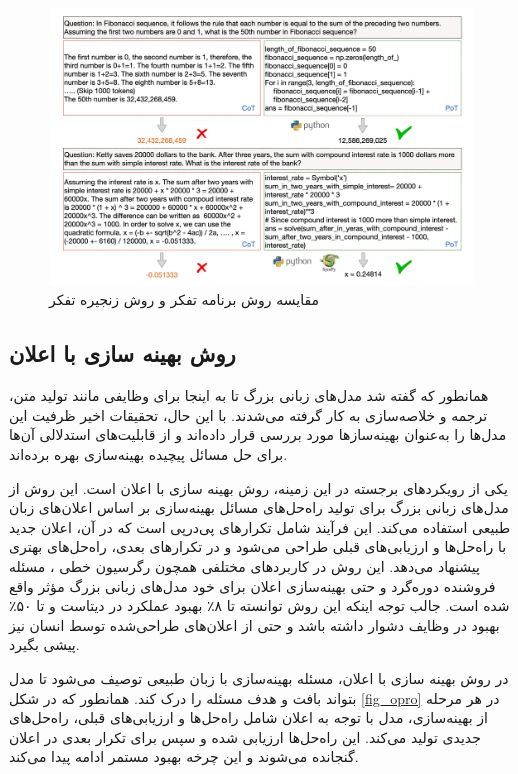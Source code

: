 \begin{figure}[!t]
	\centering
	\includegraphics[width=140mm]{images/pot}
	\caption{مقایسه روش برنامه تفکر و روش زنجیره تفکر}
	\label{fig_pot}
\end{figure}

\subsection{روش بهینه سازی با اعلان}
همانطور که گفته شد مدل‌های زبانی بزرگ تا به اینجا برای وظایفی مانند تولید متن، ترجمه و خلاصه‌سازی به کار گرفته می‌شدند. با این حال، تحقیقات اخیر ظرفیت این مدل‌ها را به‌عنوان بهینه‌سازها مورد بررسی قرار داده‌اند و از قابلیت‌های استدلالی آن‌ها برای حل مسائل پیچیده بهینه‌سازی بهره برده‌اند.

یکی از رویکردهای برجسته در این زمینه، روش بهینه سازی با اعلان 
 \cite{opro}
 است. این روش از مدل‌های زبانی بزرگ برای تولید راه‌حل‌های مسائل بهینه‌سازی بر اساس اعلان‌های زبان طبیعی استفاده می‌کند. این فرآیند شامل تکرارهای پی‌در‌پی است که در آن، اعلان جدید با راه‌حل‌ها و ارزیابی‌های قبلی طراحی می‌شود و در تکرارهای بعدی، راه‌حل‌های بهتری پیشنهاد می‌دهد. این روش در کاربردهای مختلفی همچون رگرسیون خطی
 ، مسئله فروشنده دوره‌گرد
  و حتی بهینه‌سازی اعلان برای خود مدل‌های زبانی بزرگ مؤثر واقع شده است. جالب توجه اینکه این روش توانسته تا ۸٪ بهبود عملکرد در دیتاست  و تا ۵۰٪ بهبود در وظایف دشوار
   داشته باشد و حتی از اعلان‌های طراحی‌شده توسط انسان نیز پیشی بگیرد.

در روش بهینه سازی با اعلان، مسئله بهینه‌سازی با زبان طبیعی توصیف می‌شود تا مدل بتواند بافت و هدف مسئله را درک کند. همانطور که در شکل \ref{fig_opro} در هر مرحله از بهینه‌سازی، مدل با توجه به اعلان شامل راه‌حل‌ها و ارزیابی‌های قبلی، راه‌حل‌های جدیدی تولید می‌کند. این راه‌حل‌ها ارزیابی شده و سپس برای تکرار بعدی در اعلان گنجانده می‌شوند و این چرخه بهبود مستمر ادامه پیدا می‌کند.

